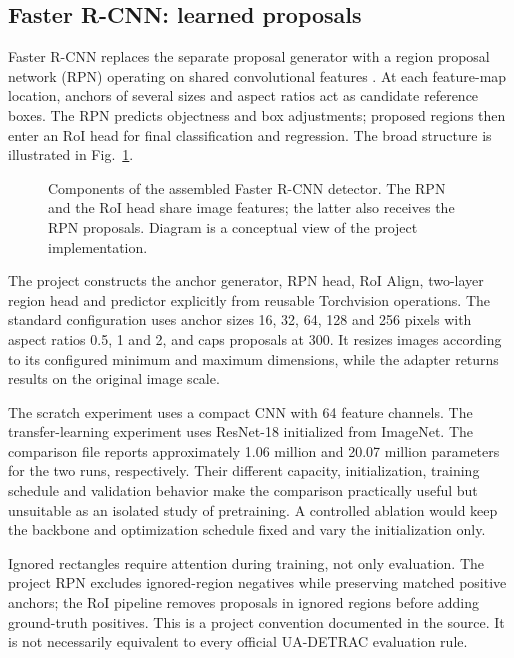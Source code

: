 \subsection{Faster R-CNN: learned proposals}
Faster R-CNN replaces the separate proposal generator with a region proposal network (RPN) operating on shared convolutional features \cite{faster}. At each feature-map location, anchors of several sizes and aspect ratios act as candidate reference boxes. The RPN predicts objectness and box adjustments; proposed regions then enter an RoI head for final classification and regression. The broad structure is illustrated in Fig.~\ref{fig:faster}.

\begin{figure}[htbp]
\centering

\caption{Components of the assembled Faster R-CNN detector. The RPN and the RoI head share image features; the latter also receives the RPN proposals. Diagram is a conceptual view of the project implementation.}
\label{fig:faster}
\end{figure}

The project constructs the anchor generator, RPN head, RoI Align, two-layer region head and predictor explicitly from reusable Torchvision operations. The standard configuration uses anchor sizes 16, 32, 64, 128 and 256 pixels with aspect ratios 0.5, 1 and 2, and caps proposals at 300. It resizes images according to its configured minimum and maximum dimensions, while the adapter returns results on the original image scale.

The scratch experiment uses a compact CNN with 64 feature channels. The transfer-learning experiment uses ResNet-18 initialized from ImageNet. The comparison file reports approximately 1.06 million and 20.07 million parameters for the two runs, respectively. Their different capacity, initialization, training schedule and validation behavior make the comparison practically useful but unsuitable as an isolated study of pretraining. A controlled ablation would keep the backbone and optimization schedule fixed and vary the initialization only.

Ignored rectangles require attention during training, not only evaluation. The project RPN excludes ignored-region negatives while preserving matched positive anchors; the RoI pipeline removes proposals in ignored regions before adding ground-truth positives. This is a project convention documented in the source. It is not necessarily equivalent to every official UA-DETRAC evaluation rule.

